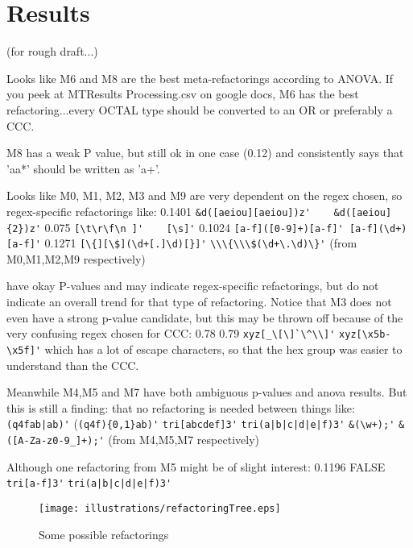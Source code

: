 
\section{Results}

(for rough draft...)

Looks like M6 and M8 are the best meta-refactorings according to ANOVA.
If you peek at MTResults Processing.csv on google docs, M6 has the best refactoring...every OCTAL type should be converted to an OR or preferably a CCC.

M8 has a weak P value, but still ok in one case (0.12) and consistently says that 'aa*' should be written as 'a+'.

Looks like M0, M1, M2, M3 and M9 are very dependent on the regex chosen, so regex-specific refactorings like:
0.1401 \verb!&d([aeiou][aeiou])z'    &d([aeiou]{2})z'!
0.075   \verb![\t\r\f\n ]'    [\s]'!
0.1024  \verb![a-f]([0-9]+)[a-f]' [a-f](\d+)[a-f]'!
0.1271  \verb![\{][\$](\d+[.]\d)[}]'!
\verb!\\\{\\\$(\d+\.\d)\}'!
(from M0,M1,M2,M9 respectively)

have okay P-values and may indicate regex-specific refactorings, but do not indicate an overall trend for that type of refactoring.
Notice that M3 does not even have a strong p-value candidate, but this may be thrown off because of the very confusing regex chosen for CCC:
0.78    0.79
\verb!xyz[_\[\]`\^\\]'!    \verb!xyz[\x5b-\x5f]'!
which has a lot of escape characters, so that the hex group was easier to understand than the CCC.



Meanwhile M4,M5 and M7 have both ambiguous p-values and anova results.  But this is still a finding: that no refactoring is needed between things like:
\verb!(q4fab|ab)'! (\verb!(q4f){0,1}ab)'!
\verb!tri[abcdef]3'!   \verb!tri(a|b|c|d|e|f)3'!
\verb!&(\w+);'!    \verb!&([A-Za-z0-9_]+);'!
(from M4,M5,M7 respectively)

Although one refactoring from M5 might be of slight interest:
0.1196  FALSE   \verb!tri[a-f]3'!  \verb!tri(a|b|c|d|e|f)3'!


\begin{figure}[tb]
\centering
\texttt{[image: illustrations/refactoringTree.eps]}
\vspace{-12pt}
\caption{Some possible refactorings}
\vspace{-6pt}
\label{fig:refactoringTree}
\end{figure}

